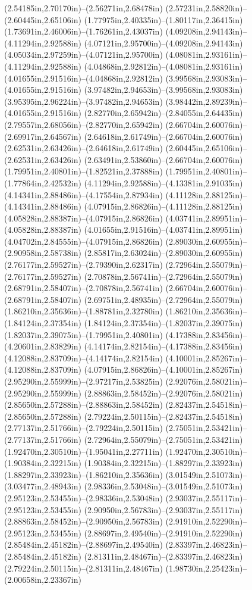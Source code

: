 (2.54185in,2.70170in)--(2.56271in,2.68478in) (2.57231in,2.58820in)--(2.60445in,2.65106in) (1.77975in,2.40335in)--(1.80117in,2.36415in) (1.73691in,2.46006in)--(1.76261in,2.43037in) (4.09208in,2.94143in)--(4.11294in,2.92588in) (4.07121in,2.95700in)--(4.09208in,2.94143in) (4.05034in,2.97259in)--(4.07121in,2.95700in) (4.08081in,2.93161in)--(4.11294in,2.92588in) (4.04868in,2.92812in)--(4.08081in,2.93161in) (4.01655in,2.91516in)--(4.04868in,2.92812in) (3.99568in,2.93083in)--(4.01655in,2.91516in) (3.97482in,2.94653in)--(3.99568in,2.93083in) (3.95395in,2.96224in)--(3.97482in,2.94653in) (3.98442in,2.89239in)--(4.01655in,2.91516in) (2.82770in,2.65942in)--(2.84055in,2.64435in) (2.79557in,2.68056in)--(2.82770in,2.65942in) (2.66704in,2.60076in)--(2.69917in,2.64567in) (2.64618in,2.61749in)--(2.66704in,2.60076in) (2.62531in,2.63426in)--(2.64618in,2.61749in) (2.60445in,2.65106in)--(2.62531in,2.63426in) (2.63491in,2.53860in)--(2.66704in,2.60076in) (1.79951in,2.40801in)--(1.82521in,2.37888in) (1.79951in,2.40801in)--(1.77864in,2.42532in) (4.11294in,2.92588in)--(4.13381in,2.91035in) (4.14341in,2.88486in)--(4.17554in,2.87934in) (4.11128in,2.88125in)--(4.14341in,2.88486in) (4.07915in,2.86826in)--(4.11128in,2.88125in) (4.05828in,2.88387in)--(4.07915in,2.86826in) (4.03741in,2.89951in)--(4.05828in,2.88387in) (4.01655in,2.91516in)--(4.03741in,2.89951in) (4.04702in,2.84555in)--(4.07915in,2.86826in) (2.89030in,2.60955in)--(2.90958in,2.58738in) (2.85817in,2.63024in)--(2.89030in,2.60955in) (2.76177in,2.59527in)--(2.79390in,2.62317in) (2.72964in,2.55079in)--(2.76177in,2.59527in) (2.70878in,2.56741in)--(2.72964in,2.55079in) (2.68791in,2.58407in)--(2.70878in,2.56741in) (2.66704in,2.60076in)--(2.68791in,2.58407in) (2.69751in,2.48935in)--(2.72964in,2.55079in) (1.86210in,2.35636in)--(1.88781in,2.32780in) (1.86210in,2.35636in)--(1.84124in,2.37354in) (1.84124in,2.37354in)--(1.82037in,2.39075in) (1.82037in,2.39075in)--(1.79951in,2.40801in) (4.17388in,2.83456in)--(4.20601in,2.83829in) (4.14174in,2.82154in)--(4.17388in,2.83456in) (4.12088in,2.83709in)--(4.14174in,2.82154in) (4.10001in,2.85267in)--(4.12088in,2.83709in) (4.07915in,2.86826in)--(4.10001in,2.85267in) (2.95290in,2.55999in)--(2.97217in,2.53825in) (2.92076in,2.58021in)--(2.95290in,2.55999in) (2.88863in,2.58452in)--(2.92076in,2.58021in) (2.85650in,2.57288in)--(2.88863in,2.58452in) (2.82437in,2.54518in)--(2.85650in,2.57288in) (2.79224in,2.50115in)--(2.82437in,2.54518in) (2.77137in,2.51766in)--(2.79224in,2.50115in) (2.75051in,2.53421in)--(2.77137in,2.51766in) (2.72964in,2.55079in)--(2.75051in,2.53421in) (1.92470in,2.30510in)--(1.95041in,2.27711in) (1.92470in,2.30510in)--(1.90384in,2.32215in) (1.90384in,2.32215in)--(1.88297in,2.33923in) (1.88297in,2.33923in)--(1.86210in,2.35636in) (3.01549in,2.51073in)--(3.03477in,2.48943in) (2.98336in,2.53048in)--(3.01549in,2.51073in) (2.95123in,2.53455in)--(2.98336in,2.53048in) (2.93037in,2.55117in)--(2.95123in,2.53455in) (2.90950in,2.56783in)--(2.93037in,2.55117in) (2.88863in,2.58452in)--(2.90950in,2.56783in) (2.91910in,2.52290in)--(2.95123in,2.53455in) (2.88697in,2.49540in)--(2.91910in,2.52290in) (2.85484in,2.45182in)--(2.88697in,2.49540in) (2.83397in,2.46823in)--(2.85484in,2.45182in) (2.81311in,2.48467in)--(2.83397in,2.46823in) (2.79224in,2.50115in)--(2.81311in,2.48467in) (1.98730in,2.25423in)--(2.00658in,2.23367in) 